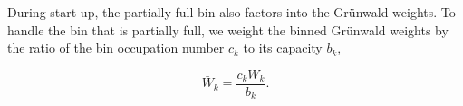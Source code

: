 During start-up, the partially full bin also factors into
the Gr{\"u}nwald weights. To handle the bin that is partially full, we
weight the binned Gr{\"u}nwald weights by the ratio of the bin occupation
number $c_k$ to its capacity $b_k$,

\begin{equation}
\bar{W}_k= \frac{c_k W_k}{b_k}.
\label{eqn:Wbar}
\end{equation} 







